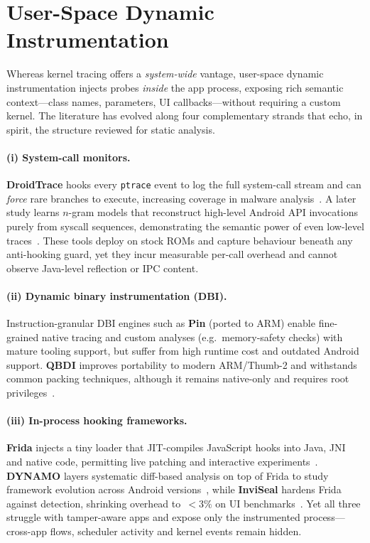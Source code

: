 \documentclass[a4paper,12pt]{report}
\begin{document}
\section{User-Space Dynamic Instrumentation}
\label{sec:rw:dynamic:user}

Whereas kernel tracing offers a \emph{system-wide} vantage, user-space dynamic
instrumentation injects probes \emph{inside} the app process, exposing rich
semantic context—class names, parameters, UI callbacks—without requiring a
custom kernel.  The literature has evolved along four complementary strands
that echo, in spirit, the structure reviewed for static analysis.

\paragraph{(i) System-call monitors.}
\textbf{DroidTrace} hooks every \texttt{ptrace} event to log the full
system-call stream and can \emph{force} rare branches to execute, increasing
coverage in malware analysis~\cite{zheng2014droidtrace}.  A later study
learns $n$-gram models that reconstruct high-level Android API invocations
purely from syscall sequences, demonstrating the semantic power of even
low-level traces~\cite{nisi2019syscall}.  These tools deploy on stock ROMs and
capture behaviour beneath any anti-hooking guard, yet they incur measurable
per-call overhead and cannot observe Java-level reflection or IPC content.

\paragraph{(ii) Dynamic binary instrumentation (DBI).}
Instruction-granular DBI engines such as \textbf{Pin} (ported to
ARM) enable fine-grained native tracing and custom analyses
(e.g.\ memory-safety checks) with mature tooling support, but
suffer from high runtime cost and outdated Android
support.  \textbf{QBDI} improves portability to modern ARM/Thumb-2
and withstands common packing techniques, although it remains native-only and
requires root privileges~\cite{qbdiblackhat2020}.

\paragraph{(iii) In-process hooking frameworks.}
\textbf{Frida} injects a tiny loader that JIT-compiles JavaScript hooks into
Java, JNI and native code, permitting live patching and interactive
experiments~\cite{frida2020}.  \textbf{DYNAMO} layers systematic diff-based
analysis on top of Frida to study framework evolution across Android
versions~\cite{dynamo2021}, while \textbf{InviSeal} hardens Frida against
detection, shrinking overhead to~$<\!3\%$ on UI benchmarks~\cite{inviseal2023}.
Yet all three struggle with tamper-aware apps and expose only the instrumented
process—cross-app flows, scheduler activity and kernel events remain hidden.
\end{document}
